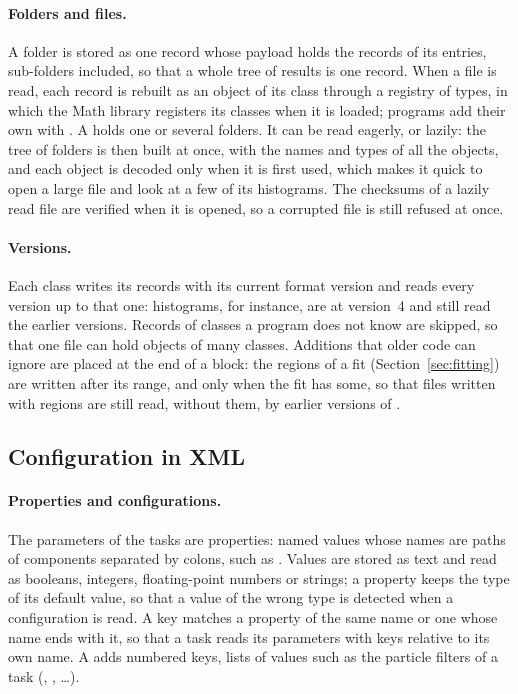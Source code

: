 \paragraph{Folders and files.}
A folder is stored as one  record whose payload holds the records of its entries, sub-folders included,
so that a whole tree of results is one record. When a file is read, each record is rebuilt as an object of its
class through a registry of types, in which the Math library registers its classes when it is loaded; programs add
their own with . A  holds one or several folders. It can be read eagerly,
or lazily: the tree of folders is then built at once, with the names and types of all the objects, and each object is
decoded only when it is first used, which makes it quick to open a large file and look at a few of its histograms.
The checksums of a lazily read file are verified when it is opened, so a corrupted file is still refused at once.

\paragraph{Versions.}
Each class writes its records with its current format version and reads every version up to that one: histograms,
for instance, are at version~4 and still read the earlier versions. Records of classes a program does not know are
skipped, so that one file can hold objects of many classes. Additions that older code can ignore are placed at the end
of a block: the regions of a fit (Section~\ref{sec:fitting}) are written after its range, and only when the fit has
some, so that files written with regions are still read, without them, by earlier versions of \Datum{}.

\subsection{Configuration in XML}
\label{sec:xml}

\paragraph{Properties and configurations.}
The parameters of the tasks are properties: named values whose names are paths of components separated by colons,
such as . Values are stored as text and read as booleans, integers, floating-point
numbers or strings; a property keeps the type of its default value, so that a value of the wrong type is detected when
a configuration is read. A key matches a property of the same name or one whose name ends with it, so that a task reads
its parameters with keys relative to its own name. A  adds numbered keys, lists of values such as
the particle filters of a task (, , \dots).

